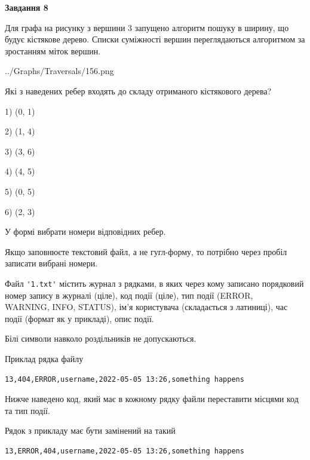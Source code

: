 \documentclass[12pt, ukrainian]{article}
\def\code#1{\Verb!#1!}
\begin{document}
{\begin {large}
{\begin {center}\textbf{Завдання 8}\end {center}}\par
Для графа на рисунку з вершини 3 запущено алгоритм пошуку в ширину, що будує кістякове дерево. Списки суміжності вершин переглядаються алгоритмом за зростанням міток вершин.\par
\begin{center}
	{../Graphs/Traversals/156.png}
\end{center}
\par Які з наведених ребер входять до складу отриманого кістякового дерева?\par
1) (0, 1)\par
2) (1, 4)\par
3) (3, 6)\par
4) (4, 5)\par
5) (0, 5)\par
6) (2, 3)\par
{\vskip 15pt} У формі вибрати номери відповідних ребер.


Якщо заповнюєте текстовий файл, а не гугл-форму, то потрібно через пробіл записа\-ти вибрані номери.\par
\newpage


Файл \code{'1.txt'} містить журнал з рядками, в яких через кому записано поряд\-ко\-вий номер запису в журналі (ціле), код події (ціле), тип події (ERROR,\\ WARNING, INFO, STATUS), ім'я користувача (складається з латиниці), час події (фор\-мат як у прикладі), опис події.

Білі символи навколо роздільників не допускаються.

Приклад рядка файлу



\begin{verbatim}
13,404,ERROR,username,2022-05-05 13:26,something happens
\end{verbatim}


Нижче наведено код, який має в кожному рядку файли переставити місцями код та тип події.

Рядок з прикладу має бути замінений на такий



\begin{verbatim}
13,ERROR,404,username,2022-05-05 13:26,something happens
\end{verbatim}





\end{large}}
\end{document}
